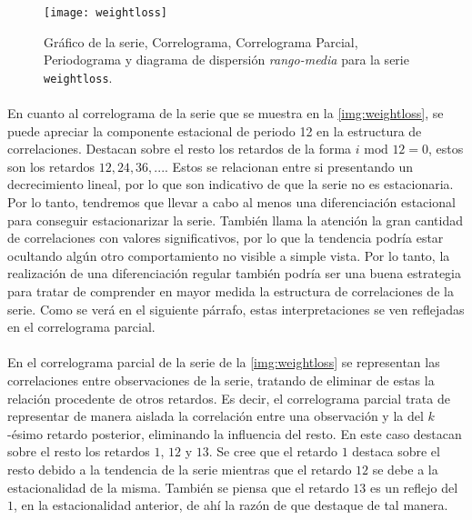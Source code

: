 \documentclass[a4paper, spanish]{article}
\begin{document}
      \begin{figure}[htb!]
        \texttt{[image: weightloss]}
        \caption{Gráfico de la serie, Correlograma, Correlograma Parcial, Periodograma y diagrama de dispersión \emph{rango-media} para la serie \texttt{weightloss}.}
        \label{img:weightloss}
      \end{figure}

      \paragraph{}
      En cuanto al correlograma de la serie que se muestra en la \autoref{img:weightloss}, se puede apreciar la componente estacional de periodo 12 en la estructura de correlaciones. Destacan sobre el resto los retardos de la forma $i \text{ mod } 12 = 0$, estos son los retardos $12, 24, 36,...$. Estos se relacionan entre si presentando un decrecimiento lineal, por lo que son indicativo de que la serie no es estacionaria. Por lo tanto, tendremos que llevar a cabo al menos una diferenciación estacional para conseguir estacionarizar la serie. También llama la atención la gran cantidad de correlaciones con valores significativos, por lo que la tendencia podría estar ocultando algún otro comportamiento no visible a simple vista. Por lo tanto, la realización de una diferenciación regular también podría ser una buena estrategia para tratar de comprender en mayor medida la estructura de correlaciones de la serie. Como se verá en el siguiente párrafo, estas interpretaciones se ven reflejadas en el correlograma parcial.

      \paragraph{}
      En el correlograma parcial de la serie de la \autoref{img:weightloss} se representan las correlaciones entre observaciones de la serie, tratando de eliminar de estas la relación procedente de otros retardos. Es decir, el correlograma parcial trata de representar de manera aislada la correlación entre una observación y la del $k$-ésimo retardo posterior, eliminando la influencia del resto. En este caso destacan sobre el resto los retardos $1$, $12$ y $13$. Se cree que el retardo $1$ destaca sobre el resto debido a la tendencia de la serie mientras que el retardo $12$ se debe a la estacionalidad de la misma. También se piensa que el retardo $13$ es un reflejo del $1$, en la estacionalidad anterior, de ahí la razón de que destaque de tal manera.
\end{document}
